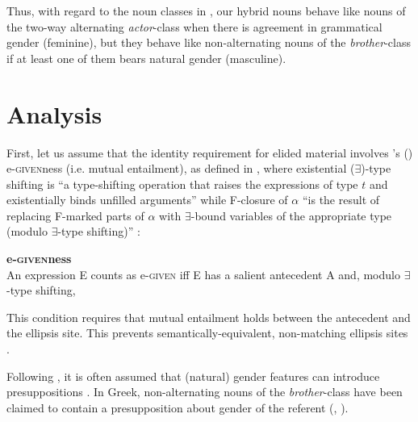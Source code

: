 \documentclass[output=paper,
modfonts,
newtxmath,
hidelinks
]{langscibook}
\begin{document}
\noindent Thus, with regard to the noun classes in , our hybrid nouns behave like nouns of the two-way alternating \textit{actor}-class when there is agreement in grammatical gender (feminine), but they behave like non-alternating nouns of the \textit{brother}-class if at least one of them bears natural gender (masculine).
		
		
\section{Analysis}	
		
		First, let us assume that the identity requirement for elided material involves \citeauthor{merchant2001}'s (\citeyear{merchant2001}) e-\textsc{given}ness (i.e. mutual entailment), as defined in , where existential ($\exists$)-type shifting is ``a type-shifting operation that raises the expressions of type $t$ and existentially binds unfilled arguments'' while F-closure of $\alpha$ ``is the result of replacing F-marked parts of $\alpha$ with $\exists$-bound variables of the appropriate type (modulo $\exists$-type shifting)'' \citep[14]{merchant2001}: 
		
		\ea \label{egive} \textbf{e-\textsc{given}ness} \citep[26]{merchant2001}\\
		An expression E counts as e-\textsc{given} iff E has a salient antecedent A and, modulo $\exists$-type shifting,
        \begin{xlist}
        \end{xlist}
        \z

     
\noindent This condition requires that mutual entailment holds between the antecedent and the ellipsis site. This prevents semantically-equivalent, non-matching ellipsis sites  \citet[27]{merchant2001}.
		
		\ea
		\label{ex20a}
		\label{ex20b}
        \z \z
        
\noindent Following \citet{cooper83}, it is often assumed that (natural) gender features can introduce presuppositions \citep[also see][]{sauerland03,sauerland08,heim08,kratzer09,spathas10,sudo-diss}.
		In Greek, non-alternating nouns of the \textit{brother}-class have been claimed to contain a presupposition about gender of the referent  (\citealt[19]{merchant14}, \citealt[715]{sudospathas-sub20}).
		
\end{document}
